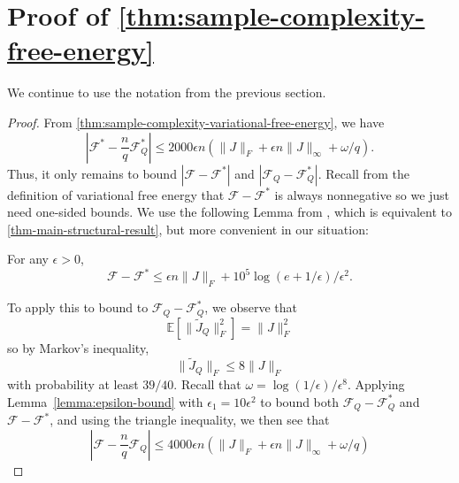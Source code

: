 \documentclass[final, 12pt]{colt2018}
\newcommand{\bE}{\mathbb{E}}
\newcommand{\F}{\mathcal{F}}
\newcommand{\E}{\bE}      %
\theoremstyle{definition}
\theoremstyle{plain}
\begin{document}
\section{Proof of \cref{thm:sample-complexity-free-energy}}
We continue to use the notation from the previous section.
\begin{proof}
From \cref{thm:sample-complexity-variational-free-energy},
we have
$$\left|\F^* - \frac{n}{q}\F^*_Q\right| \leq 2000\epsilon n \left(\|J\|_F + \epsilon n \|J\|_{\infty} + \omega/q \right).$$
Thus, it only remains to bound $|\F - \F^*|$ and $|\F_Q - \F^*_Q|$. Recall
from the definition of variational free energy that $\F - \F^*$ is always
nonnegative so we just need one-sided bounds.
We use the following Lemma from \citep{previous-paper}, which is equivalent
to \cref{thm-main-structural-result}, but more convenient in our situation:
\begin{lemma}\label{lemma:epsilon-bound}
For any $\epsilon > 0$,
\[ \F - \mathcal{F^*} \le \epsilon n \|J\|_F + 10^5 \log(e + 1/\epsilon)/\epsilon^2. \]
\end{lemma}
To apply this to bound to $\F_Q - \F^*_Q$, we observe that
\[ \E[\|\tilde J_Q\|_F^2] = \|J\|_F^2 \]
so by Markov's inequality,
\[ \|\tilde J_Q\|_F \le 8 \|J\|_F \]
with probability at least $39/40$.
Recall that $\omega = \log(1/\epsilon)/\epsilon^8$. 
Applying Lemma~\ref{lemma:epsilon-bound} with $\epsilon_1=10 \epsilon^2$ to bound both $\F_Q - \F^*_Q$ and $\F - \F^*$,
and using the triangle inequality, we then see that
\[ |\F - \frac{n}{q} \F_Q| \le 4000\epsilon n \left(\|J\|_F + \epsilon n \|J\|_{\infty} + \omega/q \right) \]
\end{proof}
\end{document}
